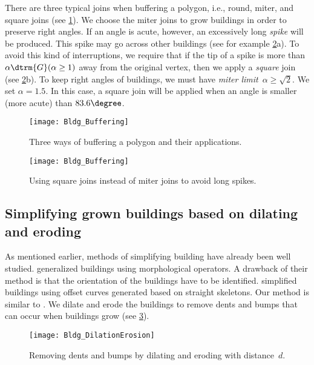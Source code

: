 There are three typical joins when buffering a polygon, i.e.,
round, miter, and square joins
(see \fig\ref{fig:Buffer_ThreeKinds}).
We choose the miter joins to grow buildings in order to
preserve right angles.
If an angle is acute, however, 
an excessively long \emph{spike} will be produced.
This spike may go across other buildings 
(see for example \fig\ref{fig:Buffer_MiterLimits}a).
To avoid this kind of interruptions, 
we require that if the tip of a spike 
is more than $\alpha \dtrm{G} (\alpha \ge 1)$
away from the original vertex, 
then we apply a \emph{square} join
(see \fig\ref{fig:Buffer_MiterLimits}b).
To keep right angles of buildings, 
we must have \emph{miter limit}~$\alpha \geq \sqrt{2}$. 
We set $\alpha  = 1.5$. 
In this case, a square join will be applied 
when an angle is smaller (more acute) than $83.6 \degree$.

\begin{figure}[tb]
	\centering
	\texttt{[image: Bldg\_Buffering]}
	\caption{Three ways of buffering a polygon and 
		their applications.}
	\label{fig:Buffer_ThreeKinds}
\end{figure}

\begin{figure}[tb]
	\centering
	\texttt{[image: Bldg\_Buffering]}
	\caption{Using square joins instead of miter joins to avoid 
	long spikes.
	}
	\label{fig:Buffer_MiterLimits}
\end{figure}




\subsection{Simplifying grown buildings based on dilating and 
eroding}
\label{sec:DilationErosion}
As mentioned earlier, 
methods of simplifying building have already been well studied. \citet{Damen2008} generalized buildings using 
morphological operators.
A drawback of their method is that the orientation of the 
buildings have to be identified.
\citet{Meijers2016} simplified buildings 
using offset curves generated based on straight skeletons.
Our method is similar to \citet{Meijers2016}.
We dilate and erode the buildings to remove dents and 
bumps that can occur when buildings grow
(see \fig\ref{fig:RemoveDentAndBump}).

\begin{figure}[tb]
	\centering
	\texttt{[image: Bldg\_DilationErosion]}
	\caption{Removing dents and bumps 
		by dilating and eroding with distance~$d$.
	}
	\label{fig:RemoveDentAndBump}
\end{figure}

